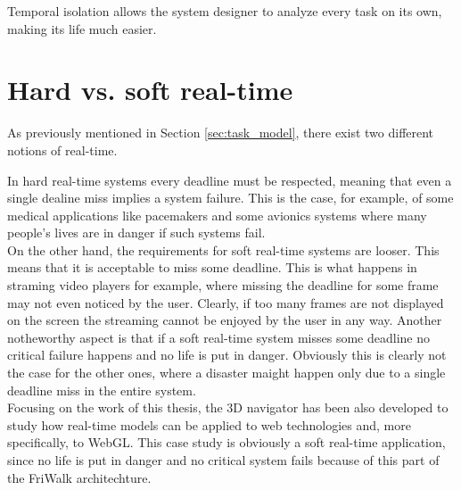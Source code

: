Temporal isolation allows the system designer to analyze every
task on its own, making its life much easier.


\section{Hard vs. soft real-time}
As previously mentioned in Section \ref{sec:task_model}, there exist two different
notions of real-time.

In hard real-time systems every deadline must be respected, meaning
that even a single dealine miss implies a system failure. This is the case, for
example, of some medical applications like pacemakers and some avionics systems
where many people's lives are in danger if such systems fail.\\
On the other hand, the requirements for soft real-time systems are looser. This
means that it is acceptable to miss some deadline.
This is what happens in straming video players for example, where missing the
deadline for some frame may not even noticed by the user. Clearly, if too many
frames are not displayed on the screen the streaming cannot be enjoyed by the
user in any way. Another notheworthy aspect is that if a soft real-time system
misses some deadline no critical failure happens and no life is put in danger.
Obviously this is clearly not the case for the other ones, where a disaster
maight happen only due to a single deadline miss in the entire system.\\
Focusing on the work of this thesis, the 3D navigator has been also developed 
to study how
real-time models can be applied to web technologies and, more specifically, to
WebGL. This case study is obviously a soft real-time application, since
no life is put in danger and no critical system fails because of this part of
the FriWalk architechture.
